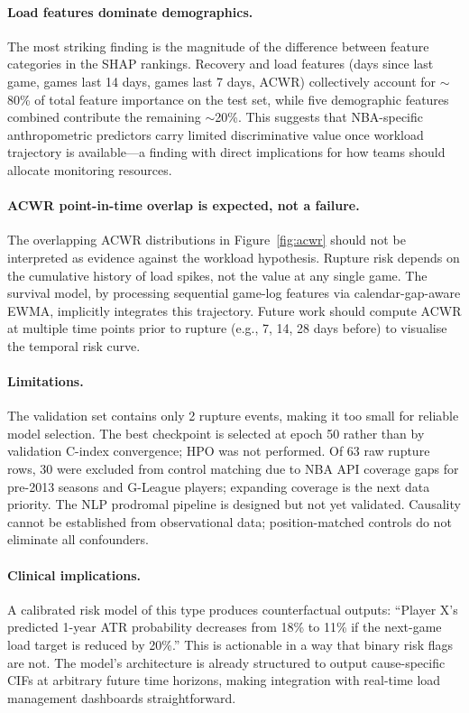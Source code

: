 \documentclass{article}
\begin{document}
\paragraph{Load features dominate demographics.}
The most striking finding is the magnitude of the difference between feature
categories in the SHAP rankings.  Recovery and load features (days since last
game, games last 14 days, games last 7 days, ACWR) collectively account for
$\sim$80\% of total feature importance on the test set, while five demographic
features combined contribute the remaining $\sim$20\%.  This suggests that
NBA-specific anthropometric predictors carry limited discriminative value once
workload trajectory is available---a finding with direct implications for how
teams should allocate monitoring resources.

\paragraph{ACWR point-in-time overlap is expected, not a failure.}
The overlapping ACWR distributions in Figure~\ref{fig:acwr} should not be
interpreted as evidence against the workload hypothesis.  Rupture risk depends
on the cumulative history of load spikes, not the value at any single game.
The survival model, by processing sequential game-log features via calendar-gap-aware
EWMA, implicitly integrates this trajectory.  Future work should compute ACWR
at multiple time points prior to rupture (e.g., 7, 14, 28 days before) to
visualise the temporal risk curve.

\paragraph{Limitations.}
The validation set contains only 2 rupture events, making it too small for
reliable model selection.  The best checkpoint is selected at epoch 50 rather
than by validation C-index convergence; HPO was not performed.  Of 63 raw
rupture rows, 30 were excluded from control matching due to NBA API coverage
gaps for pre-2013 seasons and G-League players; expanding coverage is the next
data priority.  The NLP prodromal pipeline is designed but not yet validated.
Causality cannot be established from observational data; position-matched
controls do not eliminate all confounders.

\paragraph{Clinical implications.}
A calibrated risk model of this type produces counterfactual outputs:
``Player X's predicted 1-year ATR probability decreases from 18\% to 11\% if
the next-game load target is reduced by 20\%.''  This is actionable in a way
that binary risk flags are not.  The model's architecture is already structured
to output cause-specific CIFs at arbitrary future time horizons, making
integration with real-time load management dashboards straightforward.
\end{document}

